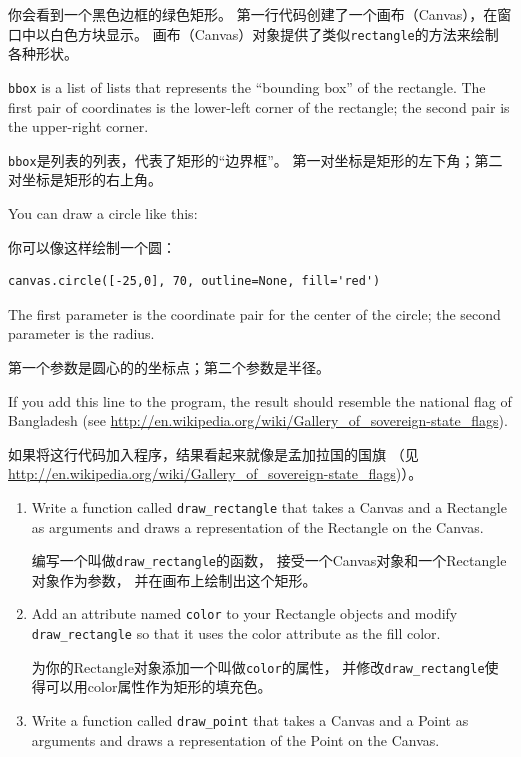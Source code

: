 \documentclass[10pt]{book}
\begin{document}
\begin{CJK}{UTF8}{gbsn}
\begin{exercise}
你会看到一个黑色边框的绿色矩形。
第一行代码创建了一个画布（Canvas），在窗口中以白色方块显示。
画布（Canvas）对象提供了类似{\tt rectangle}的方法来绘制各种形状。

{\tt bbox} is a list of lists that represents the ``bounding box''
of the rectangle.  The first pair of coordinates is the lower-left
corner of the rectangle; the second pair is the upper-right corner.

{\tt bbox}是列表的列表，代表了矩形的``边界框''。
第一对坐标是矩形的左下角；第二对坐标是矩形的右上角。

You can draw a circle like this:

你可以像这样绘制一个圆：

\begin{verbatim}
canvas.circle([-25,0], 70, outline=None, fill='red')
\end{verbatim}

The first parameter is the coordinate pair for the center of the
circle; the second parameter is the radius.

第一个参数是圆心的的坐标点；第二个参数是半径。

If you add this line to the program, 
the result should resemble the national flag of Bangladesh
(see \url{http://en.wikipedia.org/wiki/Gallery_of_sovereign-state_flags}).

如果将这行代码加入程序，结果看起来就像是孟加拉国的国旗
（见 \url{http://en.wikipedia.org/wiki/Gallery_of_sovereign-state_flags})）。

\begin{enumerate}

\item Write a function called \verb"draw_rectangle" that takes a
  Canvas and a Rectangle as arguments and draws a
  representation of the Rectangle on the Canvas.

  编写一个叫做\verb"draw_rectangle"的函数，
  接受一个Canvas对象和一个Rectangle对象作为参数，
  并在画布上绘制出这个矩形。

\item Add an attribute named {\tt color} to your Rectangle objects and
  modify \verb"draw_rectangle" so that it uses the color attribute as
  the fill color.

  为你的Rectangle对象添加一个叫做{\tt color}的属性，
  并修改\verb"draw_rectangle"使得可以用color属性作为矩形的填充色。

\item Write a function called \verb"draw_point" that takes a
  Canvas and a Point as arguments and draws a
  representation of the Point on the Canvas.


\end{enumerate}
\end{exercise}
\end{CJK}
\end{document}
